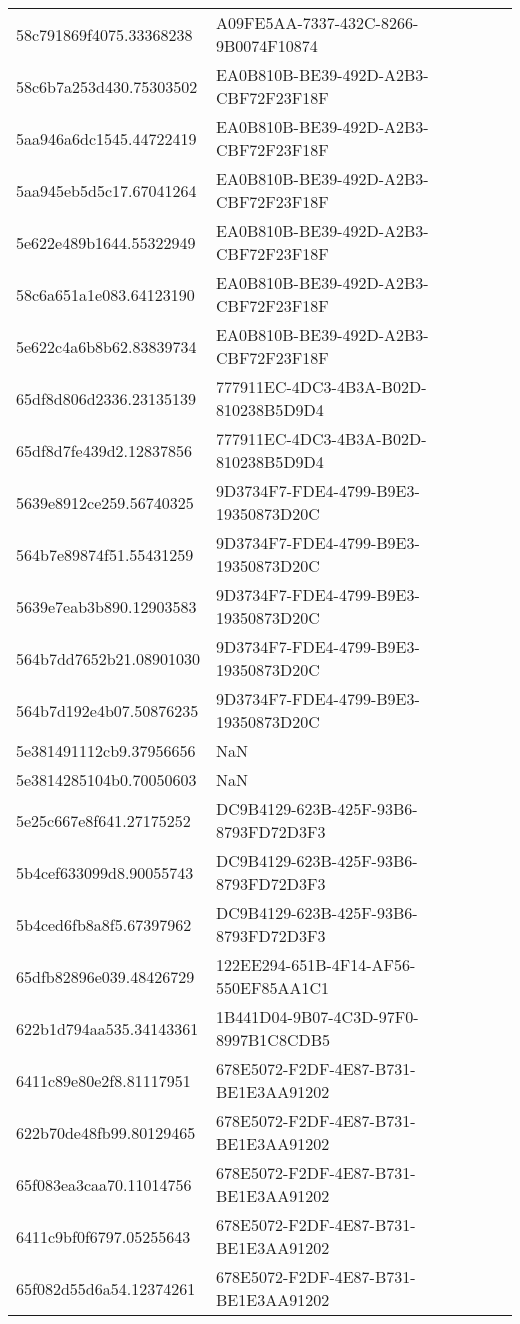 \begin{tabular}{ll}
58c791869f4075.33368238 & A09FE5AA-7337-432C-8266-9B0074F10874 \\
58c6b7a253d430.75303502 & EA0B810B-BE39-492D-A2B3-CBF72F23F18F \\
5aa946a6dc1545.44722419 & EA0B810B-BE39-492D-A2B3-CBF72F23F18F \\
5aa945eb5d5c17.67041264 & EA0B810B-BE39-492D-A2B3-CBF72F23F18F \\
5e622e489b1644.55322949 & EA0B810B-BE39-492D-A2B3-CBF72F23F18F \\
58c6a651a1e083.64123190 & EA0B810B-BE39-492D-A2B3-CBF72F23F18F \\
5e622c4a6b8b62.83839734 & EA0B810B-BE39-492D-A2B3-CBF72F23F18F \\
65df8d806d2336.23135139 & 777911EC-4DC3-4B3A-B02D-810238B5D9D4 \\
65df8d7fe439d2.12837856 & 777911EC-4DC3-4B3A-B02D-810238B5D9D4 \\
5639e8912ce259.56740325 & 9D3734F7-FDE4-4799-B9E3-19350873D20C \\
564b7e89874f51.55431259 & 9D3734F7-FDE4-4799-B9E3-19350873D20C \\
5639e7eab3b890.12903583 & 9D3734F7-FDE4-4799-B9E3-19350873D20C \\
564b7dd7652b21.08901030 & 9D3734F7-FDE4-4799-B9E3-19350873D20C \\
564b7d192e4b07.50876235 & 9D3734F7-FDE4-4799-B9E3-19350873D20C \\
5e381491112cb9.37956656 & NaN \\
5e3814285104b0.70050603 & NaN \\
5e25c667e8f641.27175252 & DC9B4129-623B-425F-93B6-8793FD72D3F3 \\
5b4cef633099d8.90055743 & DC9B4129-623B-425F-93B6-8793FD72D3F3 \\
5b4ced6fb8a8f5.67397962 & DC9B4129-623B-425F-93B6-8793FD72D3F3 \\
65dfb82896e039.48426729 & 122EE294-651B-4F14-AF56-550EF85AA1C1 \\
622b1d794aa535.34143361 & 1B441D04-9B07-4C3D-97F0-8997B1C8CDB5 \\
6411c89e80e2f8.81117951 & 678E5072-F2DF-4E87-B731-BE1E3AA91202 \\
622b70de48fb99.80129465 & 678E5072-F2DF-4E87-B731-BE1E3AA91202 \\
65f083ea3caa70.11014756 & 678E5072-F2DF-4E87-B731-BE1E3AA91202 \\
6411c9bf0f6797.05255643 & 678E5072-F2DF-4E87-B731-BE1E3AA91202 \\
65f082d55d6a54.12374261 & 678E5072-F2DF-4E87-B731-BE1E3AA91202 \\

\end{tabular}
